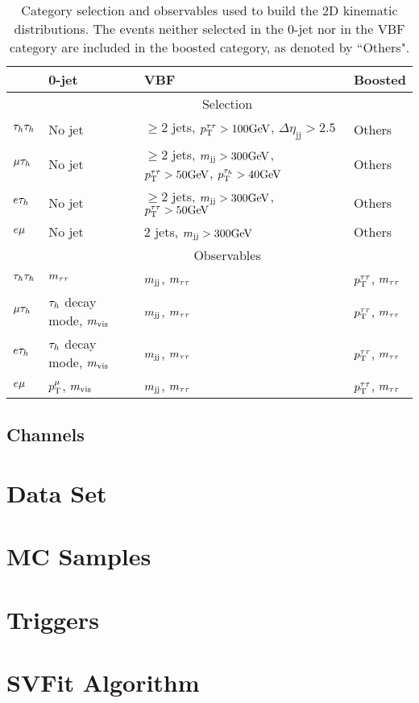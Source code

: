 \begin{table*}
\centering
\begin{tabular}{llll}
 & 0-jet & VBF & Boosted \\
\hline
 & \multicolumn{3}{c}{Selection} \\ \cline{2-4}
$\tau_{h}\tau_{h}$ & No jet &  $\geq$2 jets, $p_\mathrm{T}^{\tau\tau}>100\mathrm{GeV}$, $\Delta\eta_{\mathrm{jj}}>2.5$ & Others\\
$\mu\tau_{h}$ & No jet &  $\geq$2 jets, $m_\mathrm{jj}>300\mathrm{GeV}$, $p_\mathrm{T}^{\tau\tau}>50\mathrm{GeV}$, $p_\mathrm{T}^{\tau_{h}}>40\mathrm{GeV}$ & Others\\
$e\tau_{h}$ & No jet &  $\geq$2 jets, $m_\mathrm{jj}>300\mathrm{GeV}$, $p_\mathrm{T}^{\tau\tau}>50\mathrm{GeV}$ & Others\\
$e\mu$ & No jet & 2 jets, $m_\mathrm{jj}>300\mathrm{GeV}$ & Others \\
\hline
 & \multicolumn{3}{c}{Observables}\\ \cline{2-4}
$\tau_{h}\tau_{h}$ & $m_{\tau\tau}$                 &    $m_\mathrm{jj}$, $m_{\tau\tau}$  &   $p_\mathrm{T}^{\tau\tau}$, $m_{\tau\tau}$  \\
$\mu\tau_{h}$ & $\tau_{h}$ decay mode, $m_\text{vis}$   &    $m_\mathrm{jj}$, $m_{\tau\tau}$  &  $p_\mathrm{T}^{\tau\tau}$, $m_{\tau\tau}$  \\
$e\tau_{h}$ & $\tau_{h}$ decay mode, $m_\text{vis}$   &    $m_\mathrm{jj}$, $m_{\tau\tau}$  &  $p_\mathrm{T}^{\tau\tau}$, $m_{\tau\tau}$ \\
$e\mu$ & $p_\mathrm{T}^{\mu}$, $m_\text{vis}$   &     $m_\mathrm{jj}$, $m_{\tau\tau}$  &   $p_\mathrm{T}^{\tau\tau}$, $m_{\tau\tau}$  \\
\hline
\end{tabular}
\caption{ Category selection and observables used to build the 2D kinematic distributions. The events neither selected in the 0-jet nor in the VBF category are included in the boosted category, as denoted by ``Others".
\label{tab:categories}
}
\end{table*}

\subsection{Channels}
\section{Data Set}
\section{MC Samples}
\section{Triggers}
\section{SVFit Algorithm}

